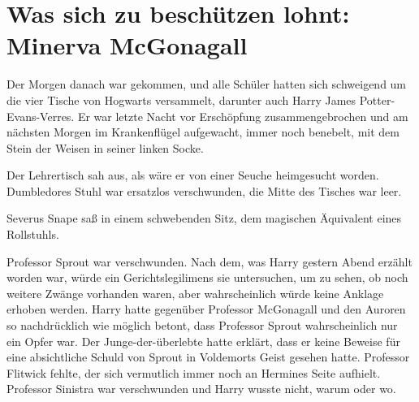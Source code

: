 \chapter{Was sich zu beschützen lohnt: Minerva McGonagall}

Der Morgen danach war gekommen, und alle Schüler hatten sich schweigend um die vier Tische von Hogwarts versammelt, darunter auch Harry James Potter-Evans-Verres. Er war letzte Nacht vor Erschöpfung zusammengebrochen und am nächsten Morgen im Krankenflügel aufgewacht, immer noch benebelt, mit dem Stein der Weisen in seiner linken Socke.

Der Lehrertisch sah aus, als wäre er von einer Seuche heimgesucht worden.
Dumbledores Stuhl war ersatzlos verschwunden, die Mitte des Tisches war leer.

Severus Snape saß in einem schwebenden Sitz, dem magischen Äquivalent eines Rollstuhls.

Professor Sprout war verschwunden. Nach dem, was Harry gestern Abend erzählt worden war, würde ein Gerichtslegilimens sie untersuchen, um zu sehen, ob noch weitere Zwänge vorhanden waren, aber wahrscheinlich würde keine Anklage erhoben werden. Harry hatte gegenüber Professor McGonagall und den Auroren so nachdrücklich wie möglich betont, dass Professor Sprout wahrscheinlich nur ein Opfer war. Der Junge-der-überlebte hatte erklärt, dass er keine Beweise für eine absichtliche Schuld von Sprout in Voldemorts Geist gesehen hatte.
Professor Flitwick fehlte, der sich vermutlich immer noch an Hermines Seite aufhielt.
Professor Sinistra war verschwunden und Harry wusste nicht, warum oder wo.

